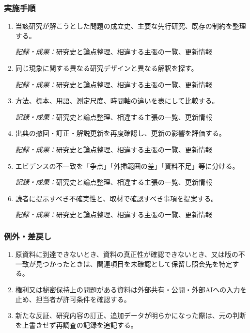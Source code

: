 \documentclass[a4paper,11pt]{article}
\begin{document}
\subsubsection*{実施手順}
\begin{enumerate}[leftmargin=2em,itemsep=0.65em]
\item 当該研究が解こうとした問題の成立史、主要な先行研究、既存の制約を整理する。\par\noindent\textit{記録・成果：}研究史と論点整理、相違する主張の一覧、更新情報\nobreak\smallskip
\item 同じ現象に関する異なる研究デザインと異なる解釈を探す。\par\noindent\textit{記録・成果：}研究史と論点整理、相違する主張の一覧、更新情報\nobreak\smallskip
\item 方法、標本、用語、測定尺度、時間軸の違いを表にして比較する。\par\noindent\textit{記録・成果：}研究史と論点整理、相違する主張の一覧、更新情報\nobreak\smallskip
\item 出典の撤回・訂正・解説更新を再度確認し、更新の影響を評価する。\par\noindent\textit{記録・成果：}研究史と論点整理、相違する主張の一覧、更新情報\nobreak\smallskip
\item エビデンスの不一致を「争点」「外挿範囲の差」「資料不足」等に分ける。\par\noindent\textit{記録・成果：}研究史と論点整理、相違する主張の一覧、更新情報\nobreak\smallskip
\item 読者に提示すべき不確実性と、取材で確認すべき事項を提案する。\par\noindent\textit{記録・成果：}研究史と論点整理、相違する主張の一覧、更新情報\nobreak\smallskip
\end{enumerate}
\subsubsection*{例外・差戻し}
\begin{enumerate}[leftmargin=2em,itemsep=0.35em]
\item 原資料に到達できないとき、資料の真正性が確認できないとき、又は版の不一致が見つかったときは、関連項目を未確認として保留し照会先を特定する。
\item 権利又は秘密保持上の問題がある資料は外部共有・公開・外部AIへの入力を止め、担当者が許可条件を確認する。
\item 新たな反証、研究内容の訂正、追加データが明らかになった際は、元の判断を上書きせず再調査の記録を追記する。
\end{enumerate}
\end{document}
